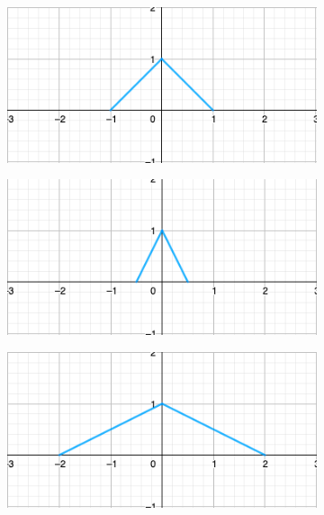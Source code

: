 \documentclass[a4paper]{book}
\begin{document}
\begin{figure}[!ht]
	\centering
	\caption{Señales continuas con cambios de escala}
	\begin{subfigure}[b]{0.45\textwidth}
		\includegraphics[width=\textwidth]{./Imágenes/aah.png}
	\end{subfigure}
	\hfill
	\begin{subfigure}[b]{0.45\textwidth}
		\includegraphics[width=\textwidth]{./Imágenes/aai.png}
	\end{subfigure}

	\begin{subfigure}[b]{0.45\textwidth}
		\includegraphics[width=\textwidth]{./Imágenes/aaj.png}
	\end{subfigure}
	\label{fig:cambio_de_escala}
\end{figure}
\end{document}
